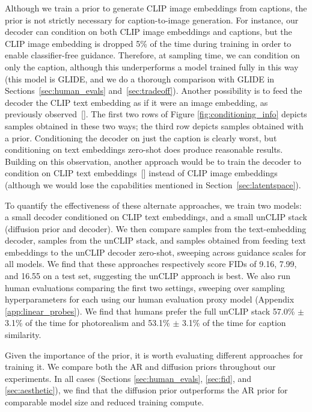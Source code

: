 \documentclass{article}
\newcommand{\shortcite}[1]{[\citenum{#1}]}
\newcommand{\modelname}{unCLIP}
\begin{document}
Although we train a prior to generate CLIP image embeddings from captions, the prior is not strictly necessary for caption-to-image generation. For instance, our decoder can condition on both CLIP image embeddings and captions, but the CLIP image embedding is dropped 5\% of the time during training in order to enable classifier-free guidance. Therefore, at sampling time, we can condition on only the caption, although this underperforms a model trained fully in this way (this model is GLIDE, and we do a thorough comparison with GLIDE in Sections~\ref{sec:human_evals} and~\ref{sec:tradeoff}). Another possibility is to feed the decoder the CLIP text embedding as if it were an image embedding, as previously observed~\shortcite{lafite,clipgen}. The first two rows of Figure \ref{fig:conditioning_info} depicts samples obtained in these two ways; the third row depicts samples obtained with a prior. Conditioning the decoder on just the caption is clearly worst, but conditioning on text embeddings zero-shot does produce reasonable results. Building on this observation, another approach would be to train the decoder to condition on CLIP text embeddings~\shortcite{vdiffusion} instead of CLIP image embeddings (although we would lose the capabilities mentioned in Section~\ref{sec:latentspace}).

To quantify the effectiveness of these alternate approaches, we train two models: a small decoder conditioned on CLIP text embeddings, and a small \modelname{} stack (diffusion prior and decoder). We then compare samples from the text-embedding decoder, samples from the \modelname{} stack, and samples obtained from feeding text embeddings to the \modelname{} decoder zero-shot, sweeping across guidance scales for all models. We find that these approaches respectively score FIDs of 9.16, 7.99, and 16.55 on a test set, suggesting the \modelname{} approach is best. We also run human evaluations comparing the first two settings, sweeping over sampling hyperparameters for each using our human evaluation proxy model (Appendix \ref{app:linear_probes}). We find that humans prefer the full \modelname{} stack 57.0\% $\pm$ 3.1\% of the time for photorealism and 53.1\% $\pm$ 3.1\% of the time for caption similarity.

Given the importance of the prior, it is worth evaluating different approaches for training it. We compare both the AR and diffusion priors throughout our experiments. In all cases (Sections \ref{sec:human_evals}, \ref{sec:fid}, and \ref{sec:aesthetic}), we find that the diffusion prior outperforms the AR prior for comparable model size and reduced training compute.
\end{document}
